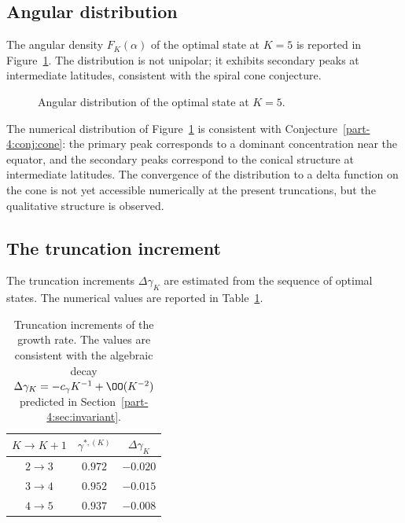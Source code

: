 \subsection{Angular distribution}
\label{part-4:ssec:angular-numeric}

The angular density $F_K(\alpha)$ of the optimal state at $K=5$ is 
reported in Figure~\ref{part-4:fig:angular}. The distribution is not 
unipolar; it exhibits secondary peaks at intermediate latitudes, 
consistent with the spiral cone conjecture.

\begin{figure}[h]
\centering
\caption{Angular distribution of the optimal state at $K=5$.}
\label{part-4:fig:angular}
\end{figure}

\begin{remark}\label{part-4:rem:cone-consistency}
The numerical distribution of Figure~\ref{part-4:fig:angular} is consistent 
with Conjecture~\ref{part-4:conj:cone}: the primary peak corresponds to a 
dominant concentration near the equator, and the secondary peaks 
correspond to the conical structure at intermediate latitudes. The 
convergence of the distribution to a delta function on the cone is 
not yet accessible numerically at the present truncations, but the 
qualitative structure is observed.
\end{remark}

\subsection{The truncation increment}
\label{part-4:ssec:increment-numeric}

The truncation increments $\Delta\gamma_K$ are estimated from the 
sequence of optimal states. The numerical values are reported in 
Table~\ref{part-4:tab:increment}.

\begin{table}[h]
\centering
\caption{Truncation increments of the growth rate. The values are 
consistent with the algebraic decay $\Delta\gamma_K = 
-c_\gamma K^{-1} + \OO(K^{-2})$ predicted in Section~\ref{part-4:sec:invariant}.}
\label{part-4:tab:increment}
\begin{tabular}{ccc}
\toprule
$K\to K+1$ & $\gamma^{\ast,(K)}$ & $\Delta\gamma_K$ \\
\midrule
$2\to 3$ & $0.972$ & $-0.020$ \\
$3\to 4$ & $0.952$ & $-0.015$ \\
$4\to 5$ & $0.937$ & $-0.008$ \\
\bottomrule
\end{tabular}
\end{table}

